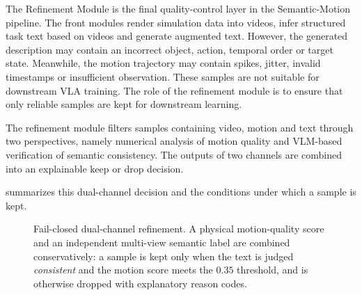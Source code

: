 \documentclass[11pt,oneside]{report}
\begin{document}
The Refinement Module is the final quality-control layer in the Semantic-Motion pipeline. The front modules render simulation data into videos, infer structured task text based on videos and generate augmented text. However, the generated description may contain an incorrect object, action, temporal order or target state. Meanwhile, the motion trajectory may contain spikes, jitter, invalid timestamps or insufficient observation. These samples are not suitable for downstream VLA training. The role of the refinement module is to ensure that only reliable samples are kept for downstream learning. 

The refinement module filters samples containing video, motion and text through two perspectives, namely numerical analysis of motion quality and VLM-based verification of semantic consistency. The outputs of two channels are combined into an explainable keep or drop decision.

 summarizes this dual-channel decision and the
conditions under which a sample is kept.

\begin{figure}[htbp]
\centering
{}
\caption[Fail-closed dual-channel refinement]{Fail-closed dual-channel refinement. A physical motion-quality score and
an independent multi-view semantic label are combined conservatively: a sample is
kept only when the text is judged \emph{consistent} and the motion score meets the
$0.35$ threshold, and is otherwise dropped with explanatory reason codes.}
\label{fig:refinement-dualchannel}
\end{figure}
\end{document}
